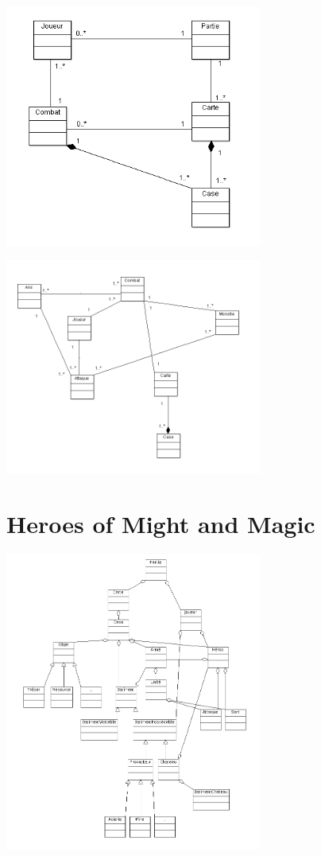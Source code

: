 \documentclass[a4paper,10pt]{report}
\begin{document}
		\includegraphics[width=320px]{diagrammes/classdiagram_dofus.png}
     
		\includegraphics[width=320px]{diagrammes/concept_dofus.png}


	\section{Heroes of Might and Magic}
	
		\includegraphics[width=320px]{diagrammes/heroes_of_might_and_magic.png}
\end{document}
